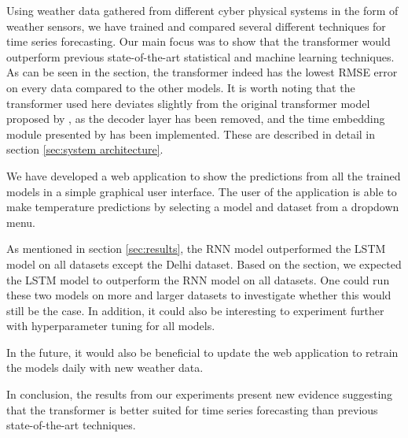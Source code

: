 Using weather data gathered from different cyber physical systems in the form of weather sensors, we have trained and compared several different techniques for time series forecasting.
Our main focus was to show that the transformer would outperform previous state-of-the-art statistical and machine learning techniques.
As can be seen in the  section, the transformer indeed has the lowest RMSE error on every data compared to the other models. 
It is worth noting that the transformer used here deviates slightly from the original transformer model proposed by \citet{AttentionIsAllYouNeed}, as the decoder layer has been removed, and the time embedding module presented by \citet{time2vec} has been implemented.
These are described in detail in section \ref{sec:system architecture}.

We have developed a web application to show the predictions from all the trained models in a simple graphical user interface. 
The user of the application is able to make temperature predictions by selecting a model and dataset from a dropdown menu. 

As mentioned in section \ref{sec:results}, the RNN model outperformed the LSTM model on all datasets except the Delhi dataset.
Based on the  section, we expected the LSTM model to outperform the RNN model on all datasets.
One could run these two models on more and larger datasets to investigate whether this would still be the case. 
In addition, it could also be interesting to experiment further with hyperparameter tuning for all models.

In the future, it would also be beneficial to update the web application to retrain the models daily with new weather data. 

In conclusion, the results from our experiments present new evidence suggesting that the transformer is better suited for time series forecasting than previous state-of-the-art techniques.